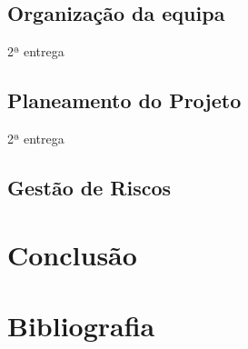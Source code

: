 \documentclass[a4paper]{report}
\begin{document}
\section{Organização da equipa}
2ª entrega
\section{Planeamento do Projeto}
2ª entrega
\section{Gestão de Riscos}
\chapter{Conclusão}
\chapter{Bibliografia }
\end{document}
